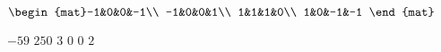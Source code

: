 \begin{Exercise}[
name={},
title={}, 
difficulty=0,
origin={\cite{GH}}]
\begin{multicols}{2}
\Question $\begin{mat}-1&0&0&-1\\  -1&0&0&1\\  1&1&1&0\\  1&0&-1&-1 \end{mat}$
\EndCurrentQuestion
\end{multicols}

\end{Exercise}
\begin{Answer}
\Question $ -59 $
\Question $ 250 $
\Question $ 3 $
\Question $ 0 $
\Question $ 0 $
\Question $ 2 $
\end{Answer}
